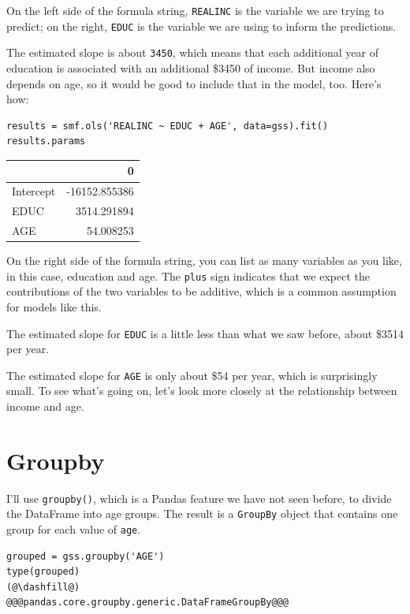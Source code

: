 On the left side of the formula string,
\passthrough{\lstinline!REALINC!} is the variable we are trying to
predict; on the right, \passthrough{\lstinline!EDUC!} is the variable we
are using to inform the predictions.

The estimated slope is about \passthrough{\lstinline!3450!}, which means
that each additional year of education is associated with an additional
\$3450 of income. But income also depends on age, so it would be good to
include that in the model, too. Here's how:

\begin{lstlisting}[]
results = smf.ols('REALINC ~ EDUC + AGE', data=gss).fit()
results.params
\end{lstlisting}

\begin{tabular}{lr}
\midrule
{} &             0 \\
\midrule
Intercept & -16152.855386 \\
EDUC      &   3514.291894 \\
AGE       &     54.008253 \\
\midrule
\end{tabular}

On the right side of the formula string, you can list as many variables
as you like, in this case, education and age. The
\passthrough{\lstinline!plus!} sign indicates that we expect the
contributions of the two variables to be additive, which is a common
assumption for models like this.

The estimated slope for \passthrough{\lstinline!EDUC!} is a little less
than what we saw before, about \$3514 per year.

The estimated slope for \passthrough{\lstinline!AGE!} is only about \$54
per year, which is surprisingly small. To see what's going on, let's
look more closely at the relationship between income and age.

\hypertarget{groupby}{%
\section{Groupby}\label{groupby}}

I'll use \passthrough{\lstinline!groupby()!}, which is a Pandas feature
we have not seen before, to divide the DataFrame into age groups. The
result is a \passthrough{\lstinline!GroupBy!} object that contains one
group for each value of \passthrough{\lstinline!age!}.

\begin{lstlisting}[]
grouped = gss.groupby('AGE')
type(grouped)
(@\dashfill@)
@@@pandas.core.groupby.generic.DataFrameGroupBy@@@
\end{lstlisting}


